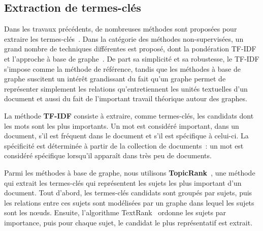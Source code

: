   \subsection{Extraction de termes-clés}
  \label{subsec:extraction_de_termes_cles}
    Dans les travaux précédents, de nombreuses méthodes sont proposées pour
    extraire les termes-clés~\cite{bougouin2013stateoftheart}. Dans la
    catégorie des méthodes non-supervisées, un grand nombre de techniques
    différentes est proposé, dont la pondération TF-IDF~\cite{jones1972tfidf} et
    l'approche à base de graphe~\cite{mihalcea2004textrank}. De part sa
    simplicité et sa robustesse, le TF-IDF s'impose comme la méthode de
    référence, tandis que les méthodes à base de graphe suscitent un intérêt
    grandissant du fait qu'un graphe permet de représenter simplement les
    relations qu'entretiennent les unités textuelles d'un document et aussi du
    fait de l'important travail théorique autour des graphes.

    La méthode \textbf{TF-IDF} consiste à extraire, comme termes-clés, les
    candidats dont les mots sont les plus importants. Un mot est considéré
    important, dans un document, s'il est fréquent dans le document et s'il est
    spécifique à celui-ci. La spécificité est déterminée à partir de la
    collection de documents~: un mot est considéré spécifique lorsqu'il apparaît
    dans très peu de documents.

    Parmi les méthodes à base de graphe, nous utilisons
    \textbf{TopicRank}~\cite{bougouin2013topicrank}, une méthode qui extrait les
    termes-clés qui représentent les sujets les plus important d'un document.
    Tout d'abord, les termes-clés candidats sont groupés par sujets, puis les
    relations entre ces sujets sont modélisées par un graphe dans lequel les
    sujets sont les n\oe{}uds. Ensuite, l'algorithme
    TextRank~\cite{mihalcea2004textrank} ordonne les sujets par importance, puis
    pour chaque sujet, le candidat le plus représentatif est extrait.

